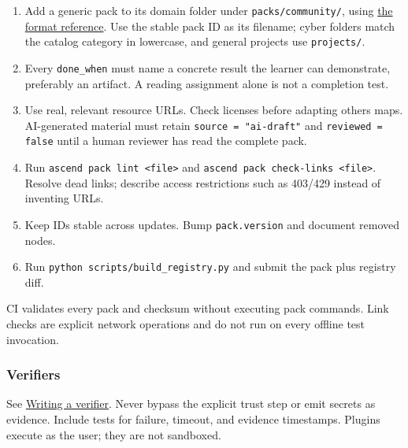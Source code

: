 \begin{enumerate}
\def\labelenumi{\arabic{enumi}.}
\tightlist
\item
  Add a generic pack to its domain folder under \texttt{packs/community/}, using
  \href{handbook.pdf}{the format reference}. Use the stable pack ID as its filename;
  cyber folders match the catalog category in lowercase, and general projects use
  \texttt{projects/}.
\item
  Every \texttt{done\_when} must name a concrete result the learner can
  demonstrate, preferably an artifact. A reading assignment alone is not
  a completion test.
\item
  Use real, relevant resource URLs. Check licenses before adapting
  others\textquotesingle{} maps. AI-generated material must retain
  \texttt{source = "ai-draft"} and \texttt{reviewed = false} until a
  human reviewer has read the complete pack.
\item
  Run \texttt{ascend pack lint \textless{}file\textgreater{}} and
  \texttt{ascend pack check-links \textless{}file\textgreater{}}.
  Resolve dead links; describe access restrictions such as 403/429
  instead of inventing URLs.
\item
  Keep IDs stable across updates. Bump \texttt{pack.version} and
  document removed nodes.
\item
  Run \texttt{python scripts/build\_registry.py} and submit the pack
  plus registry diff.
\end{enumerate}

CI validates every pack and checksum without executing pack commands.
Link checks are explicit network operations and do not run on every
offline test invocation.

\hypertarget{verifiers}{%
\subsubsection{Verifiers}\label{verifiers}}

See \href{handbook.pdf}{Writing a verifier}. Never bypass
the explicit trust step or emit secrets as evidence. Include tests for
failure, timeout, and evidence timestamps. Plugins execute as the user;
they are not sandboxed.
